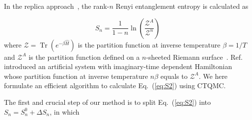 \documentclass[12pt,onecolumn,english,prl,showpacs,nofootinbib]{revtex4-1}
\DeclareMathOperator{\Tr}{Tr}
\begin{document}
In the replica approach~\cite{Calabrese:2004hl, Melko:2010jda}, the rank-$n$ Renyi entanglement entropy is calculated as 

\begin{equation}
S_{n} = \frac{1}{1-n}\ln\left(\frac{\mathcal{Z}^{A}}{\mathcal{Z}^{n}}\right)
\label{eq:S2}
\end{equation}
where $\mathcal{Z}= \Tr(e^{-\beta \hat{H}})$ is the partition 
function at inverse temperature $\beta=1/T$ and $\mathcal{Z}^{A}$ is the partition function defined on a $n$-sheeted Riemann surface~\cite{Melko:2010jda}. Ref.\cite{Broecker:2014ud} introduced an artificial system with imaginary-time dependent Hamiltonian whose partition function at inverse temperature $n\beta$ equals to $\mathcal{Z}^{A}$. We here formulate an efficient algorithm to calculate Eq.~({\ref{eq:S2}}) using CTQMC. 



The first and crucial step of our method is to split Eq.~(\ref{eq:S2}) into  $S_{n} = S_{n}^{0} + \Delta S_{n}$, in which 
\end{document}
